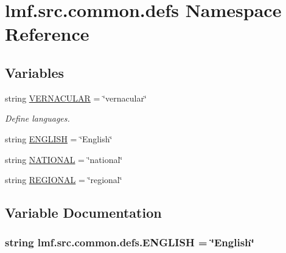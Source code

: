 \hypertarget{namespacelmf_1_1src_1_1common_1_1defs}{\section{lmf.\+src.\+common.\+defs Namespace Reference}
\label{namespacelmf_1_1src_1_1common_1_1defs}
}
\subsection*{Variables}
\begin{DoxyCompactItemize}
\item 
string \hyperlink{namespacelmf_1_1src_1_1common_1_1defs_ae57fa62a2e44365051a8e89b25f09f55}{V\+E\+R\+N\+A\+C\+U\+L\+A\+R} = \char`\"{}vernacular\char`\"{}
\begin{DoxyCompactList}\small\item\em Define languages. \end{DoxyCompactList}\item 
string \hyperlink{namespacelmf_1_1src_1_1common_1_1defs_a6655901eaac846797cd374f332d349c4}{E\+N\+G\+L\+I\+S\+H} = \char`\"{}English\char`\"{}
\item 
string \hyperlink{namespacelmf_1_1src_1_1common_1_1defs_a93be8fdd1bb5921e0a35453c0992fcbe}{N\+A\+T\+I\+O\+N\+A\+L} = \char`\"{}national\char`\"{}
\item 
string \hyperlink{namespacelmf_1_1src_1_1common_1_1defs_a1b180478b1019ae3157e3fa6e8649662}{R\+E\+G\+I\+O\+N\+A\+L} = \char`\"{}regional\char`\"{}
\end{DoxyCompactItemize}


\subsection{Variable Documentation}
\hypertarget{namespacelmf_1_1src_1_1common_1_1defs_a6655901eaac846797cd374f332d349c4}{
\subsubsection[{E\+N\+G\+L\+I\+S\+H}]{\setlength{\rightskip}{0pt plus 5cm}string lmf.\+src.\+common.\+defs.\+E\+N\+G\+L\+I\+S\+H = \char`\"{}English\char`\"{}}}\label{namespacelmf_1_1src_1_1common_1_1defs_a6655901eaac846797cd374f332d349c4}


